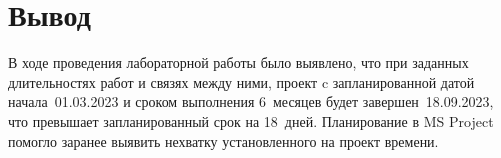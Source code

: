 \section{Вывод}

В ходе проведения лабораторной работы было выявлено, что при заданных
длительностях работ и связях между ними, проект c запланированной датой
начала~01.03.2023 и сроком выполнения 6~месяцев будет завершен~18.09.2023, что
превышает запланированный срок на 18~дней. Планирование в MS Project помогло
заранее выявить нехватку установленного на проект времени.
~\\
~\\
~\\

